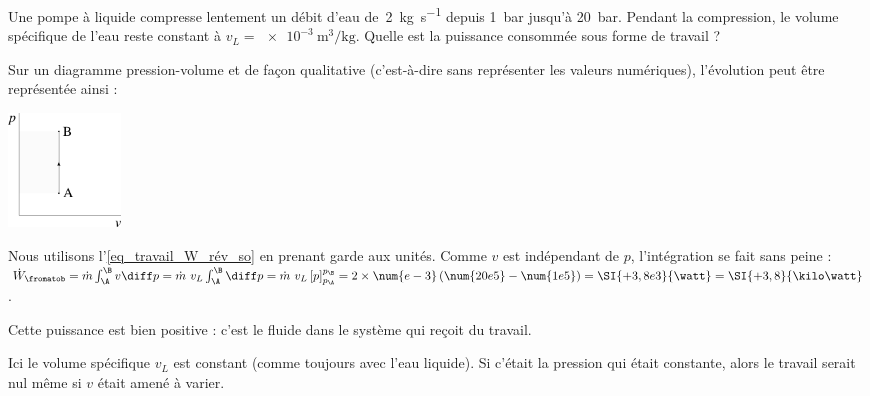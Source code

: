 		\begin{anexample}
			Une pompe à liquide compresse lentement un débit d’eau de~\SI{2}{\kilogram\per\second} depuis \SI{1}{\bar} jusqu’à \SI{20}{\bar}. Pendant la compression, le volume spécifique de l’eau reste constant à $v_L = \SI{e-3}{\metre\cubed\per\kilogram}$. Quelle est la puissance consommée sous forme de travail ?
				\begin{answer}
					Sur un diagramme pression-volume et de façon qualitative (c’est-à-dire sans représenter les valeurs numériques), l’évolution peut être représentée ainsi :
							\begin{center}
								\includegraphics[width=3cm]{images/exe_pv_isochore_so.png}
							\end{center}
					Nous utilisons l’\cref{eq_travail_W_rév_so} en prenant garde aux unités. Comme $v$ est indépendant de $p$, l’intégration se fait sans peine : $\dot{W}_\fromatob 	= \dot{m} \int_\A^\B v \diff p = \dot{m} \ v_L \int_\A^\B \diff p = \dot{m} \ v_L \left[p\right]_{p_\A}^{p_\B} = 2 \times \num{e-3} \left(\num{20e5} - \num{1e5}\right) = \SI{+3,8e3}{\watt} = \SI{+3,8}{\kilo\watt}$.
				\end{answer}
					\begin{remark}Cette puissance est bien positive : c’est le fluide dans le système qui reçoit du travail.\end{remark}
					\begin{remark}Ici le volume spécifique $v_L$ est constant (comme toujours avec l’eau liquide). Si c’était la pression qui était constante, alors le travail serait nul même si $v$ était amené à varier.\end{remark}
		\end{anexample}
		
